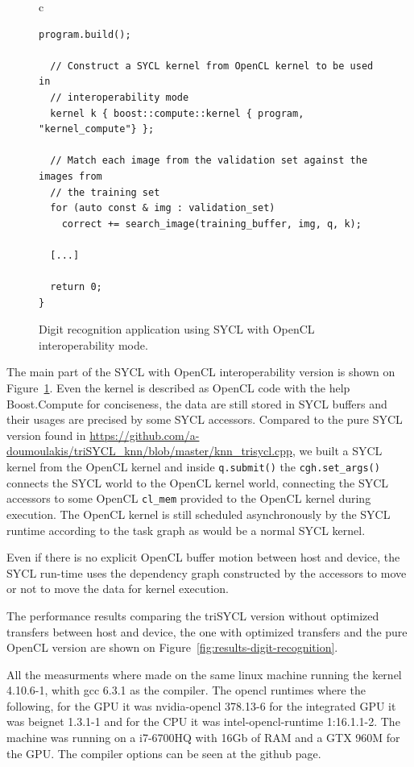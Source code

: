 \documentclass[sigplan, review]{acmart}
\begin{document}
\begin{figure}
\begin{tabular}{c}
\begin{lstlisting}[basicstyle=\scriptsize]
  program.build();

  // Construct a SYCL kernel from OpenCL kernel to be used in
  // interoperability mode
  kernel k { boost::compute::kernel { program, "kernel_compute"} };

  // Match each image from the validation set against the images from
  // the training set
  for (auto const & img : validation_set)
    correct += search_image(training_buffer, img, q, k);

  [...]

  return 0;
}
    \end{lstlisting}
  \end{tabular}
  \caption{Digit recognition application using SYCL with OpenCL
    interoperability mode.\label{fig:digit-SYCL-OpenCL-code}}
\end{figure}


The main part of the SYCL with OpenCL interoperability version is
shown on Figure~\ref{fig:digit-SYCL-OpenCL-code}. Even the kernel is
described as OpenCL code with the help Boost.Compute
\cite{Boost.Compute} for conciseness, the data are still stored in
SYCL buffers and their usages are precised by some SYCL
accessors. Compared to the pure SYCL version found in
\url{https://github.com/a-doumoulakis/triSYCL_knn/blob/master/knn_trisycl.cpp},
we built a SYCL kernel from the OpenCL kernel and inside
\lstinline|q.submit()| the \lstinline|cgh.set_args()| connects the
SYCL world to the OpenCL kernel world, connecting the SYCL accessors
to some OpenCL \lstinline|cl_mem| provided to the OpenCL kernel during
execution. The OpenCL kernel is still scheduled asynchronously by the
SYCL runtime according to the task graph as would be a normal SYCL
kernel.

Even if there is no explicit OpenCL buffer motion between host and
device, the SYCL run-time uses the dependency graph constructed by the
accessors to move or not to move the data for kernel execution.

The performance results comparing the triSYCL version without optimized
transfers between host and device, the one with optimized transfers 
and the pure OpenCL version are shown on Figure~\ref{fig:results-digit-recognition}.

All the measurments where made on the same linux machine running 
the kernel 4.10.6-1, whith gcc 6.3.1 as the compiler. The opencl
runtimes where the following, for the GPU it was nvidia-opencl 378.13-6
for the integrated GPU it was beignet 1.3.1-1 and for the CPU it was
intel-opencl-runtime 1:16.1.1-2. The machine was running on a i7-6700HQ
with 16Gb of RAM and a GTX 960M for the GPU. The compiler options can
be seen at the github page.
\end{document}
